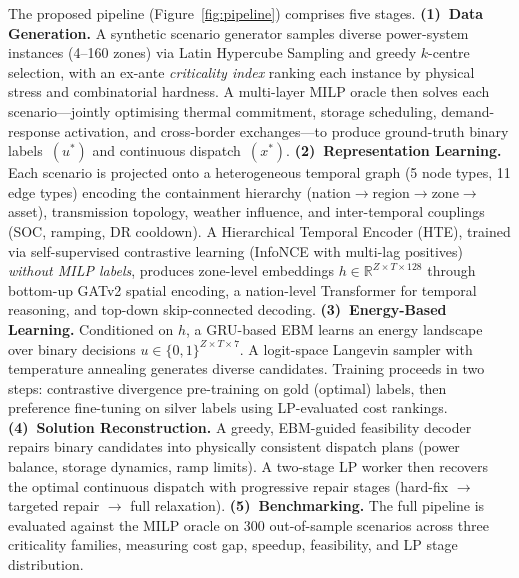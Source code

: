 \documentclass[10pt]{article}
\begin{document}
The proposed pipeline (Figure~\ref{fig:pipeline}) comprises five stages.
\textbf{(1)~Data Generation.} A synthetic scenario generator samples diverse power-system instances (4--160 zones) via Latin Hypercube Sampling and greedy $k$-centre selection, with an ex-ante \emph{criticality index} ranking each instance by physical stress and combinatorial hardness. A multi-layer MILP oracle then solves each scenario---jointly optimising thermal commitment, storage scheduling, demand-response activation, and cross-border exchanges---to produce ground-truth binary labels~$(u^*)$ and continuous dispatch~$(x^*)$.
\textbf{(2)~Representation Learning.} Each scenario is projected onto a heterogeneous temporal graph (5 node types, 11 edge types) encoding the containment hierarchy (nation$\to$region$\to$zone$\to$asset), transmission topology, weather influence, and inter-temporal couplings (SOC, ramping, DR cooldown). A Hierarchical Temporal Encoder (HTE), trained via self-supervised contrastive learning (InfoNCE with multi-lag positives) \emph{without MILP labels}, produces zone-level embeddings $h \in \mathbb{R}^{Z \times T \times 128}$ through bottom-up GATv2 spatial encoding, a nation-level Transformer for temporal reasoning, and top-down skip-connected decoding.
\textbf{(3)~Energy-Based Learning.} Conditioned on $h$, a GRU-based EBM learns an energy landscape over binary decisions $u \in \{0,1\}^{Z \times T \times 7}$. A logit-space Langevin sampler with temperature annealing generates diverse candidates. Training proceeds in two steps: contrastive divergence pre-training on gold (optimal) labels, then preference fine-tuning on silver labels using LP-evaluated cost rankings.
\textbf{(4)~Solution Reconstruction.} A greedy, EBM-guided feasibility decoder repairs binary candidates into physically consistent dispatch plans (power balance, storage dynamics, ramp limits). A two-stage LP worker then recovers the optimal continuous dispatch with progressive repair stages (hard-fix $\to$ targeted repair $\to$ full relaxation).
\textbf{(5)~Benchmarking.} The full pipeline is evaluated against the MILP oracle on 300 out-of-sample scenarios across three criticality families, measuring cost gap, speedup, feasibility, and LP stage distribution.
\end{document}
